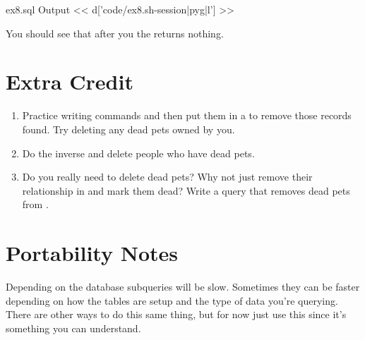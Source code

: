 \begin{code}{ex8.sql Output}
<< d['code/ex8.sh-session|pyg|l'] >>
\end{code}

You should see that after you  the  returns
nothing.

\section{Extra Credit}

\begin{enumerate}
\item Practice writing  commands and then put them in a
     to remove those records found.  Try
    deleting any dead pets owned by you.
\item Do the inverse and delete people who have dead pets.
\item Do you really need to delete dead pets?  Why not just remove their
    relationship in  and mark them dead?  Write a 
    query that removes dead pets from .
\end{enumerate}

\section{Portability Notes}

Depending on the database subqueries will be slow.  Sometimes they can be
faster depending on how the tables are setup and the type of data you're
querying.  There are other ways to do this same thing, but for now just
use this since it's something you can understand.
